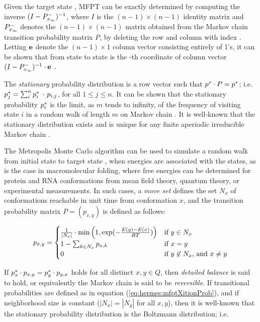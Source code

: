 Given the target state \xEnd, MFPT can be exactly
determined by computing the inverse
$(I - P^{-}_{x_\infty})^{-1}$, where $I$ is the $(n-1)\times (n-1)$ identity
matrix and $P^{-}_{x_\infty}$
denotes the $(n-1)\times (n-1)$ matrix obtained from the
Markov chain transition probability matrix $P$,
by deleting the row and column with index \xEnd.
Letting ${\bf e}$ denote the
$(n-1) \times 1$ column vector consisting entirely of 1's, it can be
shown that \mfpt from state \xStart to state \xEnd
is the \xStart-th coordinate
of column vector
$(I - P^{-}_{x_\infty})^{-1} \cdot {\bf e}$ \citep{meyermfpt}.

The {\em stationary} probability distribution \statDist
is a row vector such that $p^* \cdot P = p^*$; i.e.
$p^*_j = \sum_{i}^n p^*_i\, \cdot\, p_{i,j}$, for all $1\leq j \leq n$.
It can be shown that the stationary probability $p^*_i$ is the limit,
as $m$ tends to infinity, of the frequency of visiting state $i$ in a
random walk of length $m$ on Markov chain \mChain.
It is well-known that the stationary distribution exists and is unique
for any finite aperiodic irreducible Markov chain \citep{cloteBackofen:book}.

The Metropolis Monte Carlo algorithm \citep{metropolis:MonteCarlo} can
be used to simulate a random walk from initial state \xStart to target state
\xEnd, when energies are associated with the states, as is the case in
macromolecular folding, where free energies can be determined for
protein and RNA conformations from mean field theory, quantum theory,
or experimental measurements. In such cases, a {\em move set}
defines the set $N_x$ of conformations reachable in unit time
from conformation $x$, and the transition probability matrix
$P = (p_{x,y})$ is defined as follows:

\begin{align}
\label{eq:hermes:mfptXitionProb}
p_{x,y} =
\begin{cases}
\frac{1}{|N_x|} \cdot \min\left( 1, \boltzYmX \right)
& \text{if $y \in N_x$} \\
1 - \sum_{k \in N_x} p_{x,k} & \text{if $x=y$} \\
0 & \text{if $y \not\in N_x$, and $x \ne y$} \\
\end{cases}
\end{align}

If $p^*_x \cdot p_{x,y} = p^*_y \cdot p_{y,x}$ holds for all distinct
$x,y \in Q$, then
{\em detailed balance} is said to hold, or equivalently the Markov
chain \mChain is said to be {\em reversible}.
If transitional probabilities
are defined as in equation (\ref{eq:hermes:mfptXitionProb}), and if neighborhood
size is constant ($|N_x|=|N_y|$ for all $x,y$), then it is well-known
that the stationary probability distribution
\statDist is the Boltzmann distribution; i.e.

